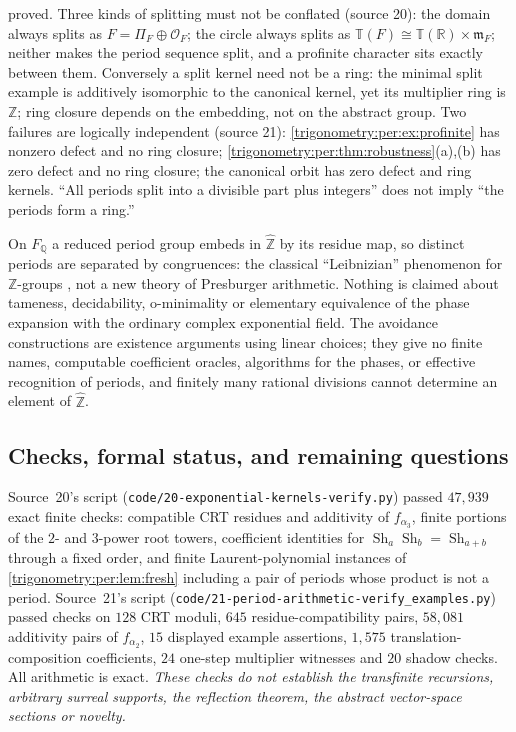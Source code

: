 \documentclass[11pt,letterpaper]{article}
\numberwithin{equation}{section}
\theoremstyle{definition}
\theoremstyle{remark}
\newcommand{\R}{\mathbb R}
\newcommand{\Q}{\mathbb Q}
\newcommand{\Z}{\mathbb Z}
\newcommand{\OO}{\mathcal O}
\newcommand{\mm}{\mathfrak m}
\newcommand{\TT}{\mathbb T}
\newcommand{\Sh}{\operatorname{Sh}}
\newcommand{\Zhat}{\widehat{\Z}}
\begin{document}
proved. Three kinds of splitting must not be conflated (source 20): the domain always splits as
$F=\Pi_F\oplus\OO_F$; the circle always splits as $\TT(F)\cong\TT(\R)\times\mm_F$; neither makes the
period sequence split, and a profinite character sits exactly between them. Conversely a split kernel
need not be a ring: the minimal split example is additively isomorphic to the canonical kernel, yet its
multiplier ring is $\Z$; ring closure depends on the embedding, not on the abstract group. Two
failures are logically independent (source 21): \cref{trigonometry:per:ex:profinite} has nonzero
defect and no ring closure; \cref{trigonometry:per:thm:robustness}(a),(b) has zero defect and no ring
closure; the canonical orbit has zero defect and ring kernels. ``All periods split into a divisible
part plus integers'' does not imply ``the periods form a ring.''

On $F_{\Q}$ a reduced period group embeds in $\Zhat$ by its residue map, so distinct periods are
separated by congruences: the classical ``Leibnizian'' phenomenon for $\Z$-groups
\cite[Theorem 3.3]{Jerabek}, not a new theory of Presburger arithmetic. Nothing is claimed about
tameness, decidability, o-minimality or elementary equivalence of the phase expansion with the ordinary
complex exponential field. The avoidance constructions are existence arguments using linear choices;
they give no finite names, computable coefficient oracles, algorithms for the phases, or effective
recognition of periods, and finitely many rational divisions cannot determine an element of $\Zhat$.

\subsection{Checks, formal status, and remaining questions}\label{trigonometry:per:sec:questions}
Source~20's script (\texttt{code/20-exponential-kernels-verify.py}) passed $47{,}939$ exact finite
checks: compatible CRT residues and additivity of $f_{\alpha_3}$, finite portions of the $2$- and
$3$-power root towers, coefficient identities for $\Sh_a\Sh_b=\Sh_{a+b}$ through a fixed order, and
finite Laurent-polynomial instances of \cref{trigonometry:per:lem:fresh} including a pair of periods
whose product is not a period. Source~21's script (\texttt{code/21-period-arithmetic-verify\_examples.py})
passed checks on $128$ CRT moduli, $645$ residue-compatibility pairs, $58{,}081$ additivity pairs of
$f_{\alpha_2}$, $15$ displayed example assertions, $1{,}575$ translation-composition coefficients,
$24$ one-step multiplier witnesses and $20$ shadow checks. All arithmetic is exact. \emph{These checks
do not establish the transfinite recursions, arbitrary surreal supports, the reflection theorem, the
abstract vector-space sections or novelty.}
\end{document}
